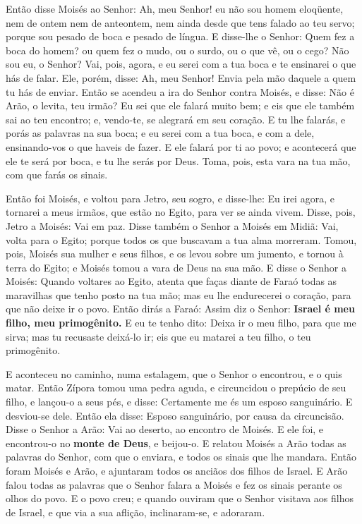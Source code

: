 Então disse Moisés ao Senhor: Ah, meu Senhor! eu não sou homem
eloqüente, nem de ontem nem de anteontem, nem ainda desde que tens
falado ao teu servo; porque sou pesado de boca e pesado de língua.
E disse-lhe o Senhor: Quem fez a boca do homem? ou quem fez o
mudo, ou o surdo, ou o que vê, ou o cego? Não sou eu, o Senhor?
Vai, pois, agora, e eu serei com a tua boca e te ensinarei o
que hás de falar. Ele, porém, disse: Ah, meu Senhor! Envia
pela mão daquele a quem tu hás de enviar. Então se acendeu a
ira do Senhor contra Moisés, e disse: Não é Arão, o levita, teu
irmão? Eu sei que ele falará muito bem; e eis que ele também sai ao
teu encontro; e, vendo-te, se alegrará em seu coração. E tu
lhe falarás, e porás as palavras na sua boca; e eu serei com a tua
boca, e com a dele, ensinando-vos o que haveis de fazer. E
ele falará por ti ao povo; e acontecerá que ele te será por boca, e
tu lhe serás por Deus. Toma, pois, esta vara na tua mão, com
que farás os sinais.

Então foi Moisés, e voltou para Jetro, seu sogro, e disse-lhe: Eu
irei agora, e tornarei a meus irmãos, que estão no Egito, para ver
se ainda vivem. Disse, pois, Jetro a Moisés: Vai em paz.
Disse também o Senhor a Moisés em Midiã: Vai, volta para o
Egito; porque todos os que buscavam a tua alma morreram.
Tomou, pois, Moisés sua mulher e seus filhos, e os levou
sobre um jumento, e tornou à terra do Egito; e Moisés tomou a vara
de Deus na sua mão. E disse o Senhor a Moisés: Quando
voltares ao Egito, atenta que faças diante de Faraó todas as
maravilhas que tenho posto na tua mão; mas eu lhe endurecerei o
coração, para que não deixe ir o povo. Então dirás a Faraó:
Assim diz o Senhor: \textbf{Israel é meu filho, meu primogênito.}
E eu te tenho dito: Deixa ir o meu filho, para que me sirva;
mas tu recusaste deixá-lo ir; eis que eu matarei a teu filho, o teu
primogênito.

E aconteceu no caminho, numa estalagem, que o Senhor o encontrou,
e o quis matar. Então Zípora tomou uma pedra aguda, e
circuncidou o prepúcio de seu filho, e lançou-o a seus pés, e disse:
Certamente me és um esposo sanguinário. E desviou-se dele.
Então ela disse: Esposo sanguinário, por causa da circuncisão.
Disse o Senhor a Arão: Vai ao deserto, ao encontro de Moisés.
E ele foi, e encontrou-o no \textbf{monte de Deus}, e beijou-o.
E relatou Moisés a Arão todas as palavras do Senhor, com que
o enviara, e todos os sinais que lhe mandara. Então foram
Moisés e Arão, e ajuntaram todos os anciãos dos filhos de Israel.
E Arão falou todas as palavras que o Senhor falara a Moisés e
fez os sinais perante os olhos do povo. E o povo creu; e
quando ouviram que o Senhor visitava aos filhos de Israel, e que via
a sua aflição, inclinaram-se, e adoraram.

